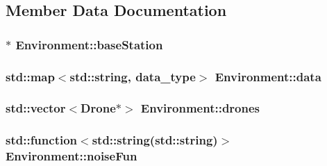 \subsection{Member Data Documentation}
\subsubsection[{\texorpdfstring{base\+Station}{baseStation}}]{$\ast$ Environment\+::base\+Station\hspace{0.3cm}{\ttfamily [private]}}\hypertarget{class_environment_a01e059baab4daf8833a638fab15eab31}{}\label{class_environment_a01e059baab4daf8833a638fab15eab31}
\subsubsection[{\texorpdfstring{data}{data}}]{\setlength{\rightskip}{0pt plus 5cm}std\+::map$<$std\+::string, {\bf data\+\_\+type}$>$ Environment\+::data\hspace{0.3cm}{\ttfamily [private]}}\hypertarget{class_environment_a8f4846d547c4891a4a2493157c8f76d6}{}\label{class_environment_a8f4846d547c4891a4a2493157c8f76d6}
\subsubsection[{\texorpdfstring{drones}{drones}}]{\setlength{\rightskip}{0pt plus 5cm}std\+::vector$<${\bf Drone}$\ast$$>$ Environment\+::drones\hspace{0.3cm}{\ttfamily [private]}}\hypertarget{class_environment_a3119b68685b61fc60e0a76918fa83f0a}{}\label{class_environment_a3119b68685b61fc60e0a76918fa83f0a}
\subsubsection[{\texorpdfstring{noise\+Fun}{noiseFun}}]{\setlength{\rightskip}{0pt plus 5cm}std\+::function$<$std\+::string(std\+::string)$>$ Environment\+::noise\+Fun\hspace{0.3cm}{\ttfamily [private]}}\hypertarget{class_environment_a95650888a9bfb308a650c049a95cb6cb}{}\label{class_environment_a95650888a9bfb308a650c049a95cb6cb}
